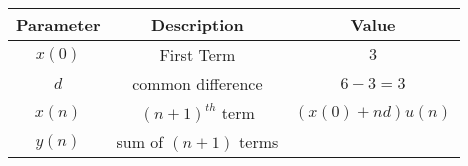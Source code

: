 \begin{tabular}{|c|c|c|}
\hline 
\textbf{Parameter}& \textbf{Description}& \textbf{Value}\\
\hline
$x(0)$ &First Term& $3$ \\
\hline
$d$ & common difference & $6 - 3 = 3 $\\
\hline
$x(n) $& $(n+1)^{th}$ term & $(x(0)+nd)u(n)$\\
\hline
$y(n)$ & sum of $(n+1)$ terms & \\
\hline
\end{tabular}
